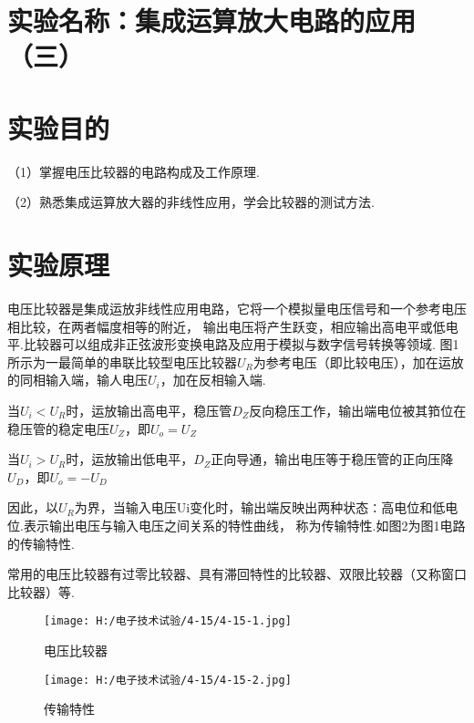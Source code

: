 \documentclass{article}
\begin{document}
	\section{ 实验名称：集成运算放大电路的应用（三）}
    \section{ 实验目的}
     （1）掌握电压比较器的电路构成及工作原理.\par
               （2）熟悉集成运算放大器的非线性应用，学会比较器的测试方法.
			   \section{ 实验原理}
               电压比较器是集成运放非线性应用电路，它将一个模拟量电压信号和一个参考电压相比较，在两者幅度相等的附近，
               输出电压将产生跃变，相应输出高电平或低电平.比较器可以组成非正弦波形变换电路及应用于模拟与数字信号转换等领域.
               图1所示为一最简单的串联比较型电压比较器$U_R$为参考电压（即比较电压），加在运放的同相输入端，输人电压$U_i$，加在反相输入端.\par
               当$U_i<U_R$时，运放输出高电平，稳压管$D_Z$反向稳压工作，输出端电位被其筘位在稳压管的稳定电压$U_Z$，即$U_o=U_Z$\par 
               当$U_i>U_R$时，运放输出低电平，$D_Z$正向导通，输出电压等于稳压管的正向压降$U_D$，即$U_o=-U_D$\par
               因此，以$U_R$为界，当输入电压Ui变化时，输出端反映出两种状态∶高电位和低电位.表示输出电压与输入电压之间关系的特性曲线，
               称为传输特性.如图2为图1电路的传输特性.\par
               常用的电压比较器有过零比较器、具有滞回特性的比较器、双限比较器（又称窗口比较器）等.\par
               \begin{figure}[h]
                \begin{minipage}[t]{0.5\linewidth} %
                  \centering   
                  \texttt{[image: H:/电子技术试验/4-15/4-15-1.jpg]}   
                  \caption{电压比较器}   
                  \label{fig:side:a}   
                \end{minipage}%
                \begin{minipage}[t]{0.5\linewidth}   
                  \centering   
                  \texttt{[image: H:/电子技术试验/4-15/4-15-2.jpg]}   
                  \caption{传输特性}   
                  \label{fig:side:b}   
                \end{minipage}   
              \end{figure}
\end{document}
